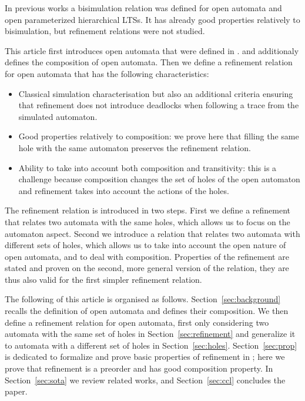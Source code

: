 \documentclass[runningheads]{llncs}
\begin{document}
In previous works \cite{fhbisim,wang:03126313} a bisimulation relation was defined for open automata and open parameterized hierarchical LTSs. It has already good properties relatively to bisimulation, but refinement relations were not studied.

This article first introduces open automata that were defined in  \cite{henrio:01299562}. %
and additionaly defines the composition of open automata.
Then we define  a refinement relation for open automata that has the following characteristics:
\begin{itemize}
\item Classical simulation characterisation but also an additional criteria ensuring that refinement does not introduce deadlocks when following a trace from the simulated automaton.
\item Good properties relatively to composition: we prove here that filling the same hole  with the same automaton preserves the refinement relation.
\item Ability to take into account both composition and transitivity: this is a challenge because composition changes the set of holes of the open automaton and refinement takes into account the actions of the holes.
\end{itemize}
The refinement relation is introduced in two steps. First we define a refinement that relates two automata with the same holes, which allows us to focus on the automaton aspect. Second we introduce a relation that relates two automata with different sets of holes, which allows us to take into account the open nature of open automata, and to deal with composition. Properties of the refinement are stated and proven on the second, more general version of the relation, they are thus also valid for the first simpler refinement relation.

The following of this article is organised as follows. 
Section~\ref{sec:background} recalls the definition of open automata and defines their composition. 
We  then  define a refinement relation for open automata, first only considering two automata with the same set of holes in Section~\ref{sec:refinement} and generalize it to automata with a different set of holes in Section~\ref{sec:holes}.  Section~\ref{sec:prop} is dedicated to formalize and prove basic properties of refinement in ; here we prove that refinement is a preorder and has good composition property. 
In Section~\ref{sec:sota} we review related works, and Section~\ref{sec:ccl} concludes the paper.
\end{document}
